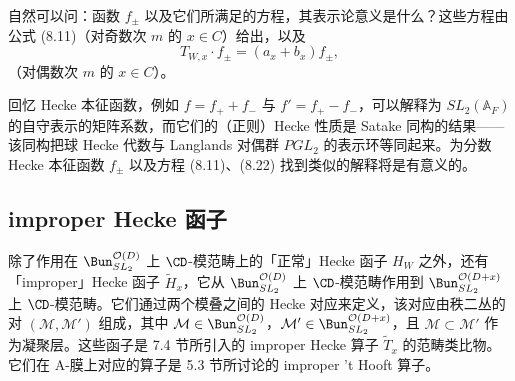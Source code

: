 
自然可以问：函数 $f_\pm$ 以及它们所满足的方程，其表示论意义是什么？这些方程由公式 (8.11)（对奇数次 $m$ 的 $x\in C$）给出，以及
\begin{equation}\tag{8.22}
T_{W,x}\cdot f_\pm = (a_x + b_x)f_\pm,
\end{equation}
（对偶数次 $m$ 的 $x\in C$）。

回忆 Hecke 本征函数，例如 $f = f_+ + f_-$ 与 $f' = f_+ - f_-$，可以解释为 $SL_2(\mathbb{A}_F)$ 的自守表示的矩阵系数，而它们的（正则）Hecke 性质是 Satake 同构的结果——该同构把球 Hecke 代数与 Langlands 对偶群 $PGL_2$ 的表示环等同起来。为分数 Hecke 本征函数 $f_\pm$ 以及方程 (8.11)、(8.22) 找到类似的解释将是有意义的。


\subsection{improper Hecke 函子}

除了作用在 $\Bun^{\mathcal{O}(D)}_{SL_2}$ 上 $\CD$-模范畴上的「正常」Hecke 函子 $H_W$ 之外，还有「improper」Hecke 函子 $\tilde{H}_x$，它从 $\Bun^{\mathcal{O}(D)}_{SL_2}$ 上 $\CD$-模范畴作用到 $\Bun^{\mathcal{O}(D+x)}_{SL_2}$ 上 $\CD$-模范畴。它们通过两个模叠之间的 Hecke 对应来定义，该对应由秩二丛的对 $(\mathcal{M}, \mathcal{M}')$ 组成，其中 $\mathcal{M}\in \Bun^{\mathcal{O}(D)}_{SL_2}$，$\mathcal{M}'\in \Bun^{\mathcal{O}(D+x)}_{SL_2}$，且 $\mathcal{M}\subset \mathcal{M}'$ 作为凝聚层。这些函子是 7.4 节所引入的 improper Hecke 算子 $\tilde{T}_x$ 的范畴类比物。它们在 A-膜上对应的算子是 5.3 节所讨论的 improper 't Hooft 算子。

